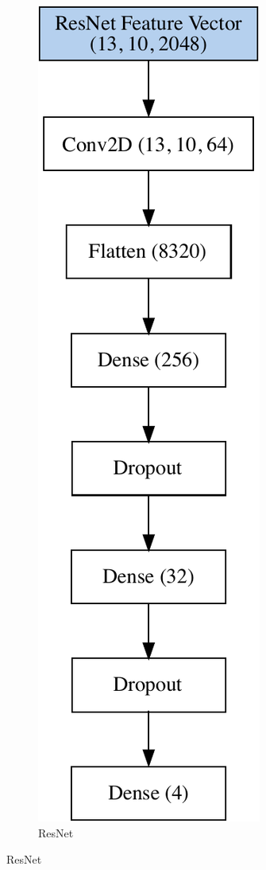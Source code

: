 \begin{figure}[h!]
\begin{subfigure}[b]{0.3\linewidth}
    \includegraphics[scale=0.6]{graphics/image-classification-results/model/resnet.pdf} 
    \caption{ResNet} 
    \label{image-classification-model:resnet} 
    \vspace{2ex}

\end{subfigure}
\end{figure}
